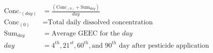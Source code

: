 \documentclass[fleqn, oneside, 11pt]{article}%
\begin{document}
\begin{preview}
\begin{align*}%
\text{Conc.}_{(day)} & = \frac{(\text{Conc}_{(0)} + \text{Sum}_{day})}{day} \nonumber \\
\text {Conc}_{(0)} & = \text{Total daily dissolved concentration} \\
\text{Sum}_{day} & = \text{Average GEEC for the }day \\
day & = \text{4}^{th}, \text{21}^{st}, \text{60}^{th}, \text{and 90}^{th} \text{ day after pesticide application} \\
\end{align*} 
\end{preview}
\end{document}
